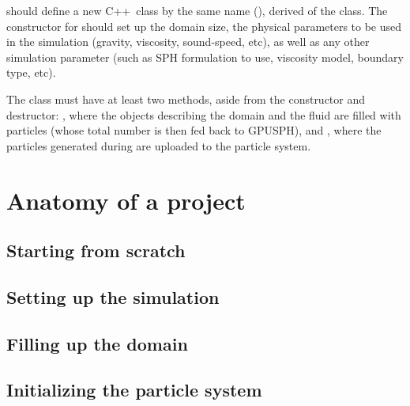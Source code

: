\documentclass[12pt]{memoir}
\newcommand{\cpp}{{\sffamily C\ttfamily++}}
\begin{document}
 should define a new \cpp\ class by the same name
(), derived of the  class. The constructor
for  should set up the domain size, the physical
parameters to be used in the simulation (gravity, viscosity,
sound-speed, etc), as well as any other simulation parameter (such as
SPH formulation to use, viscosity model, boundary type, etc).

The  class must have at least two methods, aside from the
constructor and destructor: , where the objects
describing the domain and the fluid are filled with particles (whose
total number is then fed back to GPUSPH), and , where
the particles generated during  are uploaded to the
particle system.


\section{Anatomy of a project}

\subsection{Starting from scratch}


\subsection{Setting up the simulation}


\subsection{Filling up the domain}


\subsection{Initializing the particle system}
\end{document}
